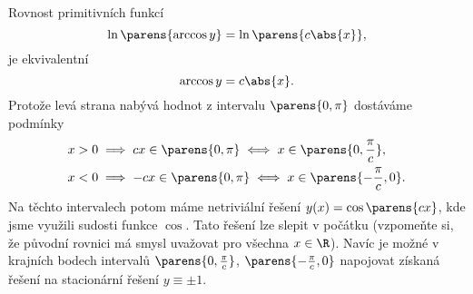 \documentclass[answers]{exam}
\begin{document}
\begin{questions}
\begin{solution}
\begin{enumerate}[label=(\roman*)]
	  	Rovnost primitivních funkcí
	  	\begin{equation*}
	  		\ln \parens{\arccos y}
	  		=
	  		\ln \parens{c \abs{x}},
	  	\end{equation*}
	  	je ekvivalentní
	  	\begin{equation*}
	  		\arccos y
	  		=
	  		c \abs{x}.
	  	\end{equation*}
	  	Protože levá strana nabývá hodnot z intervalu $\parens{0, \pi}$ dostáváme podmínky
	  	\begin{align*}
	  		x > 0 &\implies c x \in \parens{0, \pi} \iff x \in \parens{0, \frac{\pi}{c}},
	  		\\
	  		x < 0 &\implies - c x \in \parens{0, \pi} \iff x \in \parens{-\frac{\pi}{c}, 0}.
	  	\end{align*}
	  	Na těchto intervalech potom máme netriviální řešení $y(x) = \cos\parens{cx}$, kde jsme využili sudosti funkce $\cos$. Tato řešení lze slepit v počátku (vzpomeňte si, že původní rovnici má smysl uvažovat pro všechna $x \in \R$). Navíc je možné v krajních bodech intervalů $\parens{0, \frac{\pi}{c}}$, $\parens{-\frac{\pi}{c}, 0}$ napojovat získaná řešení na stacionární řešení $y \equiv \pm1$.
	  	

\end{enumerate}
\end{solution}
\end{questions}
\end{document}
